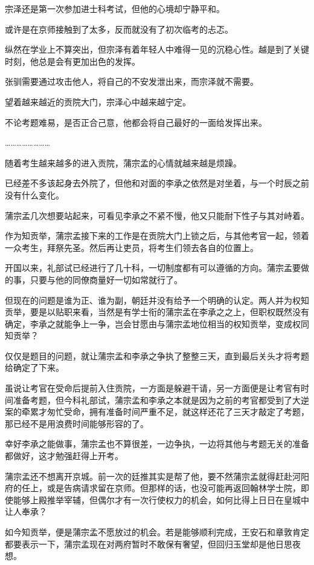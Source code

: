 宗泽还是第一次参加进士科考试，但他的心境却宁静平和。

或许是在京师接触到了太多，反而就没有了初次临考的忐忑。

纵然在学业上不算突出，但宗泽有着年轻人中难得一见的沉稳心性。越是到了关键时刻，他总是会有更加出色的发挥。

张驯需要通过攻击他人，将自己的不安发泄出来，而宗泽就不需要。

望着越来越近的贡院大门，宗泽心中越来越宁定。

不论考题难易，是否正合己意，他都会将自己最好的一面给发挥出来。

……………………

随着考生越来越多的进入贡院，蒲宗孟的心情就越来越是烦躁。

已经差不多该起身去外院了，但他和对面的李承之依然是对坐着，与一个时辰之前没有什么变化。

蒲宗孟几次想要站起来，可看见李承之不紧不慢，他又只能耐下性子与其对峙着。

作为知贡举，蒲宗孟接下来的工作是在贡院大门上锁之后，与其他考官一起，领着一众考生，拜祭先圣。然后再让吏员，将考生们领去各自的位置上。

开国以来，礼部试已经进行了几十科，一切制度都有可以遵循的方向。蒲宗孟要做的事，只要与他的同僚商量好一切如常就行了。

但现在的问题是谁为正、谁为副，朝廷并没有给予一个明确的认定。两人并为权知贡举，要是以贴职来看，当然是有学士衔的蒲宗孟在李承之之上，但职权既然没有确定，李承之就能争上一争，岂会甘愿由与蒲宗孟地位相当的权知贡举，变成权同知贡举？

仅仅是题目的问题，就让蒲宗孟和李承之争执了整整三天，直到最后关头才将考题给确定了下来。

虽说让考官在受命后提前入住贡院，一方面是躲避干请，另一方面便是让考官有时间准备考题，但今科礼部试，蒲宗孟和李承之本就是因为之前的考官都受到了大逆案的牵累才匆忙受命，拥有准备时间严重不足，就这样还花了三天才敲定了考题，那已经不是用浪费时间能够形容的了。

幸好李承之能做事，蒲宗孟也不算很差，一边争执，一边将其他与考题无关的准备都做好，这才勉强赶得上开考。

蒲宗孟还不想离开京城。前一次的廷推其实是帮了他，要不然蒲宗孟就得赶赴河阳府的任上，或是告病请求留在京师。但那样的话，也没可能再返回翰林学士院，即使能够上殿推举宰辅，但偶尔才有一次行使权力的机会，如何比得上日日在皇城中让人奉承？

如今知贡举，便是蒲宗孟不愿放过的机会。若是能够顺利完成，王安石和章敦肯定都要表示一下，蒲宗孟现在对两府暂时不敢保有奢望，但回归玉堂却是他日思夜想。

